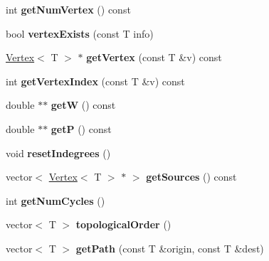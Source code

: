 \begin{DoxyCompactItemize}
\item 
int {\bfseries get\+Num\+Vertex} () const \hypertarget{class_graph_a295932f117d92c825a97ec458e0fb332}{}\label{class_graph_a295932f117d92c825a97ec458e0fb332}

\item 
bool {\bfseries vertex\+Exists} (const T info)\hypertarget{class_graph_ad1513a6b15b11cfcb02d8c7983df69c9}{}\label{class_graph_ad1513a6b15b11cfcb02d8c7983df69c9}

\item 
\hyperlink{class_vertex}{Vertex}$<$ T $>$ $\ast$ {\bfseries get\+Vertex} (const T \&v) const \hypertarget{class_graph_a08a95472b0d9bd7321660940807af060}{}\label{class_graph_a08a95472b0d9bd7321660940807af060}

\item 
int {\bfseries get\+Vertex\+Index} (const T \&v) const \hypertarget{class_graph_a98ad6f08d48ceb7527cb37433c0efc56}{}\label{class_graph_a98ad6f08d48ceb7527cb37433c0efc56}

\item 
double $\ast$$\ast$ {\bfseries getW} () const \hypertarget{class_graph_a8ff69d58c6c11dc849659999c7d7ef29}{}\label{class_graph_a8ff69d58c6c11dc849659999c7d7ef29}

\item 
double $\ast$$\ast$ {\bfseries getP} () const \hypertarget{class_graph_a6d4d0350cec9be5e776d6509208f94ee}{}\label{class_graph_a6d4d0350cec9be5e776d6509208f94ee}

\item 
void {\bfseries reset\+Indegrees} ()\hypertarget{class_graph_af34eb86d804272e6e3e221a9ed688c53}{}\label{class_graph_af34eb86d804272e6e3e221a9ed688c53}

\item 
vector$<$ \hyperlink{class_vertex}{Vertex}$<$ T $>$ $\ast$ $>$ {\bfseries get\+Sources} () const \hypertarget{class_graph_aa1a3c754f51a888e25dff2b26dfb85fc}{}\label{class_graph_aa1a3c754f51a888e25dff2b26dfb85fc}

\item 
int {\bfseries get\+Num\+Cycles} ()\hypertarget{class_graph_a694dff81073c38b669057f0c6bd4cbb1}{}\label{class_graph_a694dff81073c38b669057f0c6bd4cbb1}

\item 
vector$<$ T $>$ {\bfseries topological\+Order} ()\hypertarget{class_graph_a2e75512c089c3916dda9cf61e1185d9d}{}\label{class_graph_a2e75512c089c3916dda9cf61e1185d9d}

\item 
vector$<$ T $>$ {\bfseries get\+Path} (const T \&origin, const T \&dest)\hypertarget{class_graph_ab4054ca572c10669dd3e05d6d41c116c}{}\label{class_graph_ab4054ca572c10669dd3e05d6d41c116c}


\end{DoxyCompactItemize}
